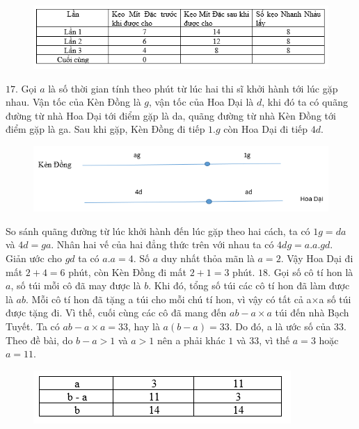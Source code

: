 \begin{figure}[H]
	\centering
	\vspace*{-5pt}
	\captionsetup{labelformat= empty, justification=centering}
	\includegraphics[width=1\linewidth]{12}
	\vspace*{-15pt}
\end{figure}
$17.$ Gọi $a$ là số thời gian tính theo phút từ lúc hai thi sĩ khởi hành tới lúc gặp nhau. Vận tốc của Kèn Đồng là $g$, vận tốc của Hoa Dại là $d$, khi đó ta có quãng đường từ nhà Hoa Dại tới điểm gặp là da, quãng đường từ nhà Kèn Đồng tới điểm gặp là ga. Sau khi gặp, Kèn Đồng đi tiếp $1.g$ còn Hoa Dại đi tiếp $4d$.
\begin{figure}[H]
	\centering
	\vspace*{-5pt}
	\captionsetup{labelformat= empty, justification=centering}
	\includegraphics[width=1\linewidth]{13}
	\vspace*{-15pt}
\end{figure}
So sánh quãng đường từ lúc khởi hành đến lúc gặp theo hai cách, ta có $1g = da$ và $4d=ga$.
\vskip 0.1cm
Nhân hai vế của hai đẳng thức trên với nhau ta có $4dg= a.a.gd$. Giản ước cho $gd$ ta có  $a.a=4$. Số $a$ duy nhất thỏa mãn là $a=2$. Vậy Hoa Dại đi mất $2+4 = 6$ phút, còn Kèn Đồng đi mất $2+1 = 3$ phút.
\vskip 0.1cm
$18.$ Gọi số cô tí hon là $a$, số túi mỗi cô đã may được là $b$. Khi đó, tổng số túi các cô tí hon đã làm được là $ab$. Mỗi cô tí hon đã tặng a túi cho mỗi chú tí hon, vì vậy có tất cả a×a số túi được tặng đi. Vì thế, cuối cùng các cô đã mang đến $ab - a\times a$ túi đến nhà Bạch Tuyết.
\vskip 0.1cm
Ta có $ab - a\times a =33$, hay là $a(b-a) = 33$. Do đó, a là ước số của $33$. Theo đề bài, do $b - a > 1$ và $a>1$ nên a phải khác $1$ và $33$, vì thế $a=3$ hoặc $a= 11$.
\begin{figure}[H]
	\centering
	\vspace*{-5pt}
	\captionsetup{labelformat= empty, justification=centering}
	\includegraphics[width=1\linewidth]{14}
	\vspace*{-15pt}
\end{figure}
